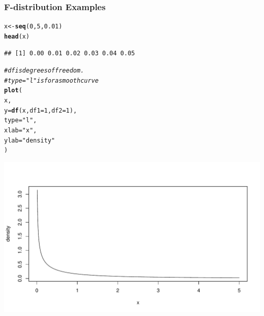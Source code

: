 \documentclass[oneside]{book}\usepackage[]{graphicx}\usepackage[dvipsnames,table,xcdraw]{xcolor}
\makeatletter
\def\maxwidth{ %
  \ifdim\Gin@nat@width>\linewidth
    \linewidth
  \else
    \Gin@nat@width
  \fi
}
\newcommand{\hlnum}[1]{\textcolor[rgb]{0.686,0.059,0.569}{#1}}%
\newcommand{\hlstr}[1]{\textcolor[rgb]{0.192,0.494,0.8}{#1}}%
\newcommand{\hlcom}[1]{\textcolor[rgb]{0.678,0.584,0.686}{\textit{#1}}}%
\newcommand{\hlstd}[1]{\textcolor[rgb]{0.345,0.345,0.345}{#1}}%
\newcommand{\hlkwb}[1]{\textcolor[rgb]{0.69,0.353,0.396}{#1}}%
\newcommand{\hlkwc}[1]{\textcolor[rgb]{0.333,0.667,0.333}{#1}}%
\newcommand{\hlkwd}[1]{\textcolor[rgb]{0.737,0.353,0.396}{\textbf{#1}}}%
\newenvironment{kframe}{%
 \def\at@end@of@kframe{}%
 \ifinner\ifhmode%
  \def\at@end@of@kframe{\end{minipage}}%
  \begin{minipage}{\columnwidth}%
 \fi\fi%
 \def\FrameCommand##1{\hskip\@totalleftmargin \hskip-\fboxsep
 \colorbox{shadecolor}{##1}\hskip-\fboxsep
     \hskip-\linewidth \hskip-\@totalleftmargin \hskip\columnwidth}%
 \MakeFramed {\advance\hsize-\width
   \@totalleftmargin\z@ \linewidth\hsize
   \@setminipage}}%
 {\par\unskip\endMakeFramed%
 \at@end@of@kframe}
\newenvironment{knitrout}{}{} %
\makeatother
\begin{document}
\subsubsection{F-distribution Examples}

\begin{knitrout}
\color{fgcolor}\begin{kframe}
\begin{alltt}
\hlstd{x} \hlkwb{<-} \hlkwd{seq}\hlstd{(}\hlnum{0}\hlstd{,}\hlnum{5}\hlstd{,}\hlnum{0.01}\hlstd{)}
\hlkwd{head}\hlstd{(x)}
\end{alltt}
\begin{verbatim}
## [1] 0.00 0.01 0.02 0.03 0.04 0.05
\end{verbatim}
\begin{alltt}
\hlcom{# df is degrees of freedom.}
\hlcom{# type = "l" is for a smooth curve}
\hlkwd{plot}\hlstd{(}
\hlstd{x,}
\hlkwc{y} \hlstd{=} \hlkwd{df}\hlstd{(x,} \hlkwc{df1} \hlstd{=} \hlnum{1}\hlstd{,} \hlkwc{df2} \hlstd{=} \hlnum{1}\hlstd{),}
\hlkwc{type} \hlstd{=} \hlstr{"l"}\hlstd{,}
\hlkwc{xlab} \hlstd{=} \hlstr{"x"}\hlstd{,}
\hlkwc{ylab} \hlstd{=} \hlstr{"density"}
\hlstd{)}
\end{alltt}
\end{kframe}

{\centering \includegraphics[width=\maxwidth]{figure/unnamed-chunk-34-1} 

}



\end{knitrout}
\end{document}
